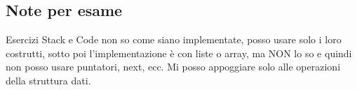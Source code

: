\subsection{Note per esame}
Esercizi Stack e Code non so come siano implementate, posso usare solo i loro costrutti, sotto
poi l'implementazione è con liste o array, ma NON lo so e quindi non posso usare puntatori, next, ecc.
Mi posso appoggiare solo alle operazioni della struttura dati.
